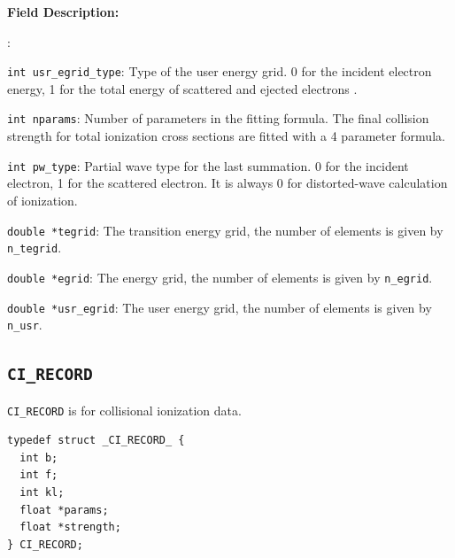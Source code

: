 \documentclass[twoside,letterpaper]{refrep}
\newenvironment{dbdesc}{\textbf{Field Description:} \begin{list}
	{:}{\setlength{\labelwidth}{2in}
	   \setlength{\leftmargin}{2in}
	   \setlength{\labelsep}{0.1in}
	   \setlength{\rightmargin}{0.2in}}}
	{\end{list}}
\begin{document}
\begin{dbdesc}
\item[\texttt{int usr\_egrid\_type}:] Type of the user energy grid. 0 for the
incident electron energy, 1 for the total energy of scattered and ejected
electrons .
\item[\texttt{int nparams}:] Number of parameters in the fitting formula. The
final collision strength for total ionization cross sections are fitted with a
4 parameter formula.
\item[\texttt{int pw\_type}:] Partial wave type for the last summation. 0 for
the incident electron, 1 for the scattered electron. It is always 0 for
distorted-wave calculation of ionization.
\item[\texttt{double *tegrid}:] The transition energy grid, the number of
elements is given by \texttt{n\_tegrid}.
\item[\texttt{double *egrid}:] The energy grid, the number of elements is
given by \texttt{n\_egrid}.
\item[\texttt{double *usr\_egrid}:] The user energy grid, the number of
elements is given by \texttt{n\_usr}.
\end{dbdesc}

\subsection{\texttt{CI\_RECORD}}
\texttt{CI\_RECORD} is for collisional ionization data.

\begin{verbatim}
typedef struct _CI_RECORD_ {
  int b;
  int f;
  int kl;
  float *params;
  float *strength;
} CI_RECORD;
\end{verbatim}
\end{document}
